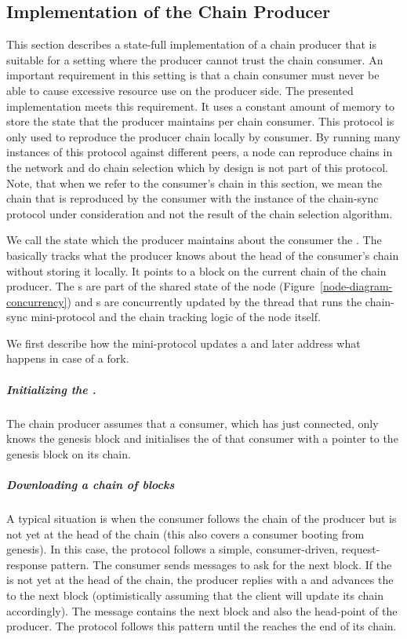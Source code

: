 \subsection{Implementation of the Chain Producer}
This section describes a state-full implementation of a chain producer that is suitable for a setting where
the producer cannot trust the chain consumer.
An important requirement in this setting
is that a chain consumer must never be able to cause excessive resource use on the producer side.
The presented implementation meets this requirement.
It uses a constant amount of memory to store the state that the producer maintains
per chain consumer.  This protocol is only used to reproduce the producer
chain locally by consumer.  By running many instances of this protocol against
different peers, a node can reproduce chains in the network and
do chain selection which by design is not part of this protocol.
Note, that when we refer to the consumer's chain in this section, we mean
the chain that is reproduced by the consumer with the instance of
the chain-sync protocol under consideration and not the result of the chain selection algorithm.

We call the state which the producer maintains about the consumer the \readpointer{}.
The \readpointer{} basically tracks what the producer knows about the head of
the consumer's chain without storing it locally.
It points to a block on the current chain of the chain producer.
The \readpointer{}s are part of the shared state of the node (Figure~\ref{node-diagram-concurrency}) and
\readpointer{}s are concurrently updated by the thread that runs the chain-sync mini-protocol and the
chain tracking logic of the node itself.

We first describe how the mini-protocol updates a \readpointer{} and later address what happens in case
of a fork.
\subparagraph{Initializing the \readpointer{}.}
The chain producer assumes that a consumer, which has just connected,
only knows the genesis block and initialises the \readpointer{} of that consumer
with a pointer to the genesis block on its chain.

\subparagraph{Downloading a chain of blocks}
A typical situation is when the consumer follows the chain of the producer but is not yet at the head of the
chain (this also covers a consumer booting from genesis).
In this case, the protocol follows a simple, consumer-driven, request-response pattern.
The consumer sends \MsgRequestNext{} messages to ask for the next block.
If the \readpointer{} is not yet at the head of the chain,
the producer replies with a \MsgRollForward{} and advances the \readpointer{} to
the next block (optimistically assuming that the client will update its chain
accordingly).
The \MsgRollForward{} message contains the next block and also the head-point of the producer.
The protocol follows this pattern until the \readpointer{} reaches the end of its chain.

